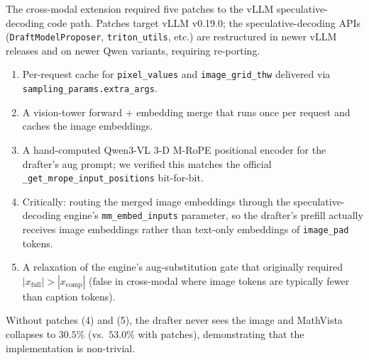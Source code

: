 \documentclass[11pt]{article}
\theoremstyle{plain}
\theoremstyle{definition}
\begin{document}
The cross-modal extension required five patches to the vLLM speculative-decoding code path. Patches target vLLM v0.19.0; the speculative-decoding APIs (\texttt{DraftModelProposer}, \texttt{triton\_utils}, etc.) are restructured in newer vLLM releases and on newer Qwen variants, requiring re-porting.
\begin{enumerate}\itemsep0pt
\item Per-request cache for \texttt{pixel\_values} and \texttt{image\_grid\_thw} delivered via \texttt{sampling\_params.extra\_args}.
\item A vision-tower forward + embedding merge that runs once per request and caches the image embeddings.
\item A hand-computed Qwen3-VL 3-D M-RoPE positional encoder for the drafter's aug prompt; we verified this matches the official \texttt{\_get\_mrope\_input\_positions} bit-for-bit.
\item Critically: routing the merged image embeddings through the speculative-decoding engine's \texttt{mm\_embed\_inputs} parameter, so the drafter's prefill actually receives image embeddings rather than text-only embeddings of \texttt{image\_pad} tokens.
\item A relaxation of the engine's aug-substitution gate that originally required $|x_{\text{full}}| > |x_{\text{comp}}|$ (false in cross-modal where image tokens are typically fewer than caption tokens).
\end{enumerate}
Without patches (4) and (5), the drafter never sees the image and MathVista collapses to $30.5\%$ (vs.\ $53.0\%$ with patches), demonstrating that the implementation is non-trivial.


\end{document}
